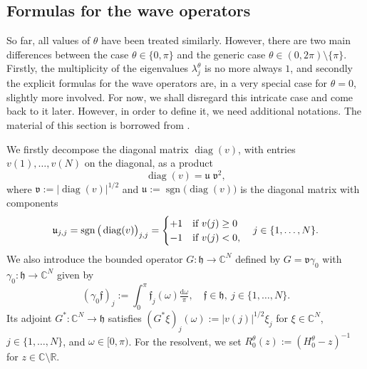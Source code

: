 \documentclass[11pt]{article}
\def\C{\mathbb C}
\def\d{\mathrm d}
\def\f{\mathfrak f}
\def\h{\mathfrak h}
\def\R{\mathbb R}
\def\u{\mathfrak u}
\def\v{\mathfrak v}
\def\diag{\mathop{\mathrm{diag}}\nolimits}
\def\sgn{\mathop{\mathrm{sgn}}\nolimits}
\begin{document}
\subsection{Formulas for the wave operators}

So far, all values of $\theta$ have been treated similarly. 
However, there are two main differences between the case $\theta \in \{0,\pi\}$ and the 
generic case $\theta\in (0,2\pi)\setminus \{\pi\}$. Firstly, the multiplicity of the eigenvalues
$\lambda^\theta_j$ is no more always $1$, and secondly the explicit formulas for the wave operators are, in a very special case for $\theta=0$, slightly more involved. 
For now, we shall disregard this intricate case and come back to it later.
However, in order to define it, we need additional notations.
The material of this section is borrowed from \cite[Sec.~3--5]{NRT}.

We firstly decompose the diagonal matrix $\diag(v)$, with entries $v(1),\dots,v(N)$ on the diagonal, as a product
$$
\diag(v)=\u\;\!\v^2,
$$
where $\v:=|\diag(v)|^{1/2}$ and $\u:=\sgn\big(\diag(v)\big)$ is the diagonal matrix
with components
$$
\u_{j,j}
=\sgn\big(\diag(v)\big)_{j,j}=
\begin{cases}
+1 &\hbox{if $v(j)\ge0$}\\
-1 &\hbox{if $v(j)<0$,}
\end{cases}
\quad j\in\{1,\dots,N\}.
$$
We also introduce the bounded operator $G:\h\to\C^N$ defined by
$G=\v\gamma_0$ with 
$\gamma_0:\h\to\C^N$ given by
$$
(\gamma_0\f)_j:=\int_0^\pi \f_j(\omega)\tfrac{\d\omega}\pi,
\quad \f\in\h,~j\in\{1,\dots,N\}.
$$
Its adjoint  $G^*:\C^N\to\h$ satisfies
$(G^*\xi)_j(\omega):=|v(j)|^{1/2}\xi_j$ for 
$\xi\in\C^N$, $j\in\{1,\dots,N\}$, and $\omega\in[0,\pi)$.
For the resolvent, we set $R_0^\theta(z):=(H_0^\theta-z)^{-1}$ for $z\in \C\setminus \R$.
\end{document}
